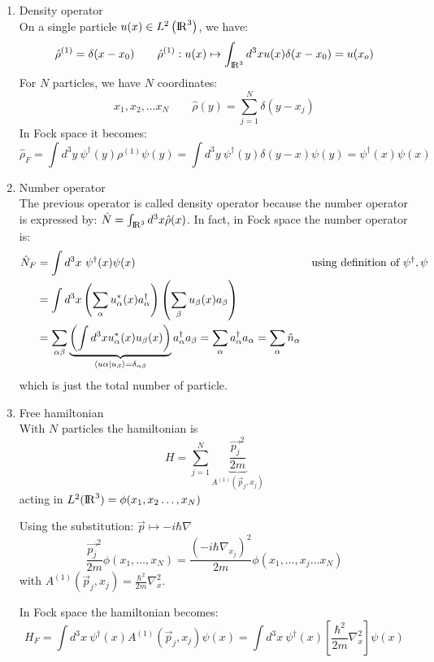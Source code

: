 \begin{enumerate}[label=\roman*)]
    \item Density operator\\
    On a single particle $u(x) \in L^2\left({\rm I\!R}^3\right)$, we have:
    $$ \hat \rho^{(1)} = \delta(x-x_0) \qquad \hat \rho^{(1)}: u(x) \mapsto \int_{{\rm I\!R}^3} d^3 x u(x) \delta(x-x_0) = u(x_o)$$
    For $N$ particles, we have $N$ coordinates: 
    $$x_1, x_2, \dots x_N \qquad \hat \rho(y) = \sum_{j=1}^N \delta (y-x_j)$$
    In Fock space it becomes:
    $$ \hat \rho_F = \int d^3y\ \psi^\dag(y) \rho^{(1)}\psi(y) = \int d^3y\ \psi^\dag (y) \delta(y-x) \psi(y) = \psi^\dag(x) \psi(x)$$

    \item Number operator\\
    The previous operator is called density operator because the number operator is expressed by: $ \hat N = \int_{{\rm I\!R}^3} d^3 x \hat\rho (x)$. In fact, in Fock space the number operator is:
    \begin{align*}
        \hat N_F &= \int d^3x\ \psi^\dag(x) \psi(x) &\text{using definition of $\psi^\dag, \psi$}\\
        &= \int d^3 x\left(\sum_\alpha u_\alpha^*(x) a_\alpha^\dag\right) \left(\sum_\beta u_\beta(x) a_\beta\right) \\
        &= \sum_{\alpha\beta}\underbrace{\left(\int d^3 x u_\alpha^*(x) u_\beta(x) \right)}_{\left\langle u\alpha \middle| u_\beta \right\rangle = \delta_{\alpha\beta}} a_\alpha^\dag a_\beta = \sum_\alpha a_\alpha^\dag a_\alpha = \sum_\alpha \hat n_\alpha
    \end{align*}
    which is just the total number of particle.

    \item Free hamiltonian\\
    With $N$ particles the hamiltonian is $$ H = \sum_{j=1}^N \underbrace{\frac{\vec {p_j}^2}{2m}}_{A^{(1)}(\vec p_j, x_j)}$$
    acting in $L^2({\rm I\!R}^3) = \phi(x_1,x_2 \dots, x_N)$

    Using the substitution: $\vec p \mapsto -i\hbar\nabla$
    $$\frac{\vec {p_j}^2}{2m}\phi(x_1, \dots, x_N) = \frac{\left(-i\hbar\nabla_{x_j}\right)^2}{2m} \phi(x_1,\dots, x_j \dots x_N)$$
    with $A^{(1)}(\vec p_j, x_j) = \frac {\hbar^2}{2m} \nabla_x^2$.

    In Fock space the hamiltonian becomes:
    \begin{equation}\label{eq:hamiltonian fock}
        H_F = \int d^3x\ \psi^\dag (x) A^{(1)}(\vec p_j, x_j)\psi(x) = \int d^3x\ \psi^\dag(x) \left[\frac{\hbar^2}{2m} \nabla^2_x\right]\psi(x)
    \end{equation}


\end{enumerate}
